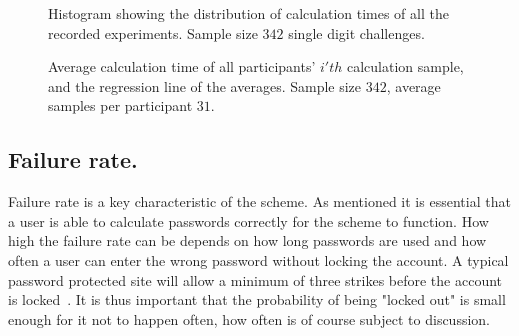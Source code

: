 \begin{figure}
    \centering
    \caption{Histogram showing the distribution of calculation times of all the recorded experiments. Sample size $342$ single digit challenges.}
    \label{histo-calctimes}
\end{figure}


\begin{figure}
    \centering
{}
\caption{Average calculation time of all participants' $i'th$ calculation sample, and the regression line of the averages. Sample size $342$, average samples per participant $31$.}
\label{scatter-regression}
\end{figure}


\subsection{Failure rate.}
Failure rate is a key characteristic of the scheme. As mentioned it is essential that a user is able to calculate passwords correctly for the scheme to function. How high the failure rate can be depends on how long passwords are used and how often a user can enter the wrong password without locking the account. A typical password protected site will allow a minimum of three strikes before the account is locked~\cite{10-strikes}. It is thus important that the probability of being "locked out" is small enough for it not to happen often, how often is of course subject to discussion.

